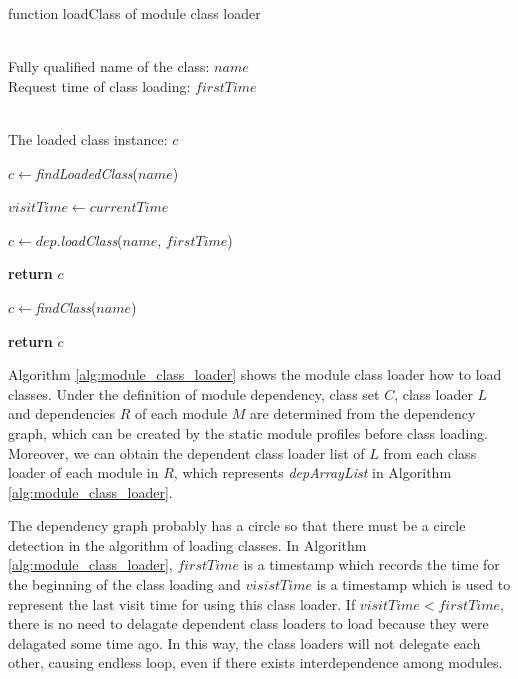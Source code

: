 \documentclass[conference]{IEEEtran}
\begin{document}
\begin{algorithm}[ht]
\caption{function loadClass of module class loader}
\label{alg:module_class_loader}
\begin{algorithmic}[1]
\REQUIRE ~~\\
Fully qualified name of the class: $name$ \\
Request time of class loading: $firstTime$

\ENSURE ~~\\
The loaded class instance: $c$

\STATE $c\leftarrow$\emph{findLoadedClass}($name$)


	\STATE $visitTime\leftarrow currentTime$
	
		
		\STATE $c\leftarrow dep.$\emph{loadClass}($name$, $firstTime$)
		
			
			\STATE \textbf{return} $c$

		\ENDIF
	
	\ENDFOR

	\STATE $c\leftarrow$\emph{findClass}($name$)

\ELSE
	
	\STATE \textbf{return} $c$

\ENDIF


\end{algorithmic}
\end{algorithm}


Algorithm \ref{alg:module_class_loader} shows the module class loader how to load classes. 
Under the definition of module dependency, class set $C$, class loader $L$ and dependencies $R$ of each module $M$ are determined from the dependency graph, which can be created by the static module profiles before class loading.
Moreover, we can obtain the dependent class loader list of $L$ from each class loader of each module in $R$, which represents \emph{depArrayList} in Algorithm \ref{alg:module_class_loader}. 

The dependency graph probably has a circle so that there must be a circle detection in the algorithm of loading classes.
In Algorithm \ref{alg:module_class_loader}, $firstTime$ is a timestamp which records the time for the beginning of the class loading and $visistTime$ is a timestamp which is used to represent the last visit time for using this class loader. 
If $visitTime < firstTime$, there is no need to delagate dependent class loaders to load because they were delagated some time ago.
In this way, the class loaders will not delegate each other, causing endless loop, even if there exists interdependence among modules.
\end{document}
